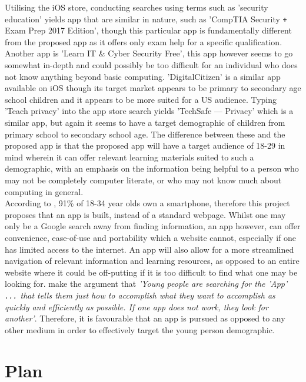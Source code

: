 \documentclass{article}
\begin{document}
Utilising the iOS store, conducting searches using terms such as 'security education' yields app that are similar in nature, such as 'CompTIA Security {\texttt{+}} Exam Prep 2017 Edition', though this particular app is fundamentally different from the proposed app as it offers only exam help for a specific qualification. Another app is 'Learn IT \& Cyber Security Free', this app however seems to go somewhat in-depth and could possibly be too difficult for an individual who does not know anything beyond basic computing. 'DigitalCitizen' is a similar app available on iOS though its target market appears to be primary to secondary age school children and it appears to be more suited for a US audience. Typing 'Teach privacy' into the app store search yields 'TechSafe --- Privacy' which is a similar app, but again it seems to have a target demographic of children from primary school to secondary school age. The difference between these and the proposed app is that the proposed app will have a target audience of 18-29 in mind wherein it can offer relevant learning materials suited to such a demographic, with an emphasis on the information being helpful to a person who may not be completely computer literate, or who may not know much about computing in general. \\
\indent According to \cite{street_mobile_2017}, 91\% of 18-34 year olds own a smartphone, therefore this project proposes that an app is built, instead of a standard webpage. Whilst one may only be a Google search away from finding information, an app however, can offer convenience, ease-of-use and portability which a website cannot, especially if one has limited access to the internet. An app will also allow for a more streamlined navigation of relevant information and learning resources, as opposed to an entire website where it could be off-putting if it is too difficult to find what one may be looking for. \cite{noauthor_talking_nodate} make the argument that \textit{'Young people are searching for the 'App' {\texttt{...}} that tells them just how to accomplish what they want to accomplish as quickly and efficiently as possible. If one app does not work, they look for another'}. Therefore, it is favourable that an app is pursued as opposed to any other medium in order to effectively target the young person demographic.

\section{Plan}
\end{document}
